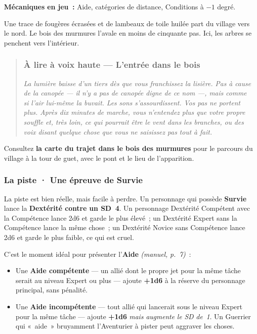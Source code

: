 \documentclass[10pt,a4paper]{article}
\newcommand{\tightlist}{\setlength{\itemsep}{0pt}\setlength{\parskip}{0pt}}
\begin{document}
\textbf{Mécaniques en jeu~:} Aide, catégories de distance, Conditions à $-1$ degré.

Une trace de fougères écrasées et de lambeaux de toile huilée part du village vers le nord. Le bois des murmures l’avale en moins de cinquante pas. Ici, les arbres se penchent vers l’intérieur.

\begin{quote}
\subsubsection{À lire à voix haute --- L’entrée dans le bois}\label{uxe0-lire-entrer-dans-les-bois}

\emph{La lumière baisse d’un tiers dès que vous franchissez la lisière. Pas à cause de la canopée --- il n’y a pas de canopée digne de ce nom ---, mais comme si l’air lui-même la buvait. Les sons s’assourdissent. Vos pas ne portent plus. Après dix minutes de marche, vous n’entendez plus que votre propre souffle et, très loin, ce qui pourrait être le vent dans les branches, ou des voix disant quelque chose que vous ne saisissez pas tout à fait.}
\end{quote}

Consultez \textbf{la carte du trajet dans le bois des murmures} pour le parcours du village à la tour de guet, avec le pont et le lieu de l’apparition.

\subsubsection{La piste · Une épreuve de Survie}\label{la-piste-uxe9preuve-de-survie}

La piste est bien réelle, mais facile à perdre. Un personnage qui possède \textbf{Survie} lance la \textbf{Dextérité contre un SD~4}. Un personnage Dextérité Compétent avec la Compétence lance 2d6 et garde le plus élevé~; un Dextérité Expert sans la Compétence lance la même chose~; un Dextérité Novice sans Compétence lance 2d6 et garde le plus faible, ce qui est cruel.

C’est le moment idéal pour présenter l’\textbf{Aide} \emph{(manuel, p.~7)}~:

\begin{itemize}
\tightlist
\item
  Une \textbf{Aide compétente} --- un allié dont le propre jet pour la même tâche serait au niveau Expert ou plus --- ajoute \textbf{+1d6} à la réserve du personnage principal, sans pénalité.
\item
  Une \textbf{Aide incompétente} --- tout allié qui lancerait sous le niveau Expert pour la même tâche --- ajoute \textbf{+1d6} \emph{mais augmente le SD de~1}. Un Guerrier qui «~aide~» bruyamment l’Aventurier à pister peut aggraver les choses.
\end{itemize}
\end{document}
